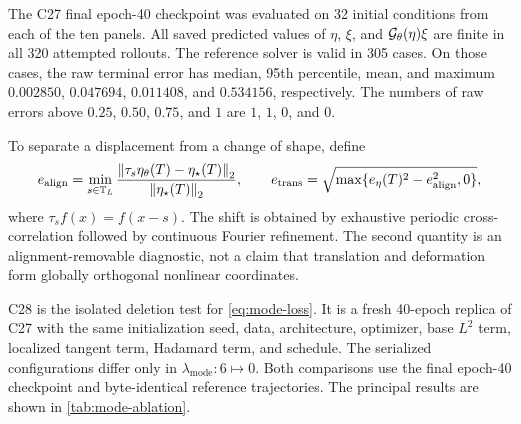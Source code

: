 The C27 final epoch-40 checkpoint was evaluated on 32
initial conditions from each of the ten panels.  All saved predicted values
of $\eta$, $\xi$, and $\mathcal{G}_{\theta}(\eta)\xi$ are finite in all 320 attempted
rollouts.  The reference solver is valid in 305 cases.  On those cases, the
raw terminal error has median, 95th percentile, mean, and maximum
$0.002850$, $0.047694$, $0.011408$, and $0.534156$, respectively.  The numbers
of raw errors above $0.25$, $0.50$, $0.75$, and $1$ are $1$, $1$, $0$, and
$0$.

To separate a displacement from a change of shape, define
\begin{equation}
  e_{\mathrm{align}}
  =\min_{s\in\mathbb{T}_L}
  \frac{\left\lVert \tau_s\eta_\theta(T)-\eta_\star(T)\right\rVert_2}
       {\left\lVert \eta_\star(T)\right\rVert_2},
  \qquad
  e_{\mathrm{trans}}
  =\sqrt{\max\{e_\eta(T)^2-e_{\mathrm{align}}^2,0\}},
  \label{eq:aligned-errors}
\end{equation}
where $\tau_s f(x)=f(x-s)$.  The shift is obtained by exhaustive periodic
cross-correlation followed by continuous Fourier refinement.  The second
quantity is an alignment-removable diagnostic, not a claim that translation
and deformation form globally orthogonal nonlinear coordinates.

C28 is the isolated deletion test for \eqref{eq:mode-loss}.  It is a fresh
40-epoch replica of C27 with the same initialization seed, data, architecture,
optimizer, base $L^2$ term, localized tangent term, Hadamard term, and schedule.
The serialized configurations differ only in
$\lambda_{\mathrm{mode}}:6\mapsto0$.  Both comparisons use the final epoch-40
checkpoint and byte-identical reference trajectories.  The principal results
are shown in \cref{tab:mode-ablation}.

